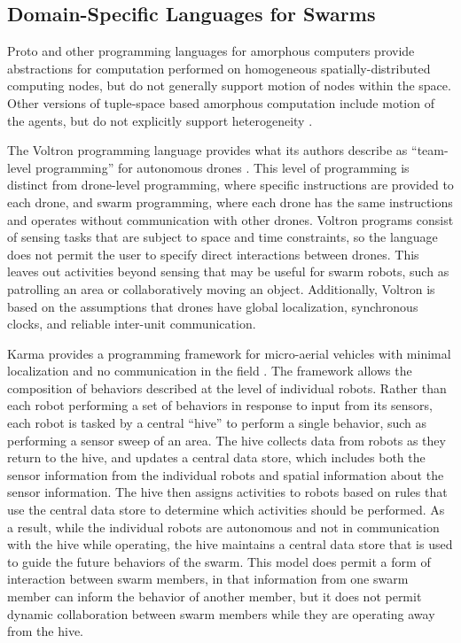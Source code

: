 \subsection{Domain-Specific Languages for Swarms} \label{section:Domain_Specific_Languages_for_Swarms}

Proto and other programming languages for amorphous computers provide abstractions for computation performed on homogeneous spatially-distributed computing nodes, but do not generally support motion of nodes within the space. 
Other versions of tuple-space based amorphous computation include motion of the agents, but do not explicitly support heterogeneity \citep{viroli2012linda}.

The Voltron programming language provides what its authors describe as ``team-level programming'' for autonomous drones \citep{mottola2014team}.
This level of programming is distinct from drone-level programming, where specific instructions are provided to each drone, and swarm programming, where each drone has the same instructions and operates without communication with other drones.
Voltron programs consist of sensing tasks that are subject to space and time constraints, so the language does not permit the user to specify direct interactions between drones. 
This leaves out activities beyond sensing that may be useful for swarm robots, such as patrolling an area or collaboratively moving an object.
Additionally, Voltron is based on the assumptions that drones have global localization, synchronous clocks, and reliable inter-unit communication.   

Karma provides a programming framework for micro-aerial vehicles with minimal localization and no communication in the field \citep{dantu2011programming}.
The framework allows the composition of behaviors described at the level of individual robots. 
Rather than each robot performing a set of behaviors in response to input from its sensors, each robot is tasked by a central ``hive'' to perform a single behavior, such as performing a sensor sweep of an area. 
The hive collects data from robots as they return to the hive, and updates a central data store, which includes both the sensor information from the individual robots and spatial information about the sensor information. 
The hive then assigns activities to robots based on rules that use the central data store to determine which activities should be performed. 
As a result, while the individual robots are autonomous and not in communication with the hive while operating, the hive maintains a central data store that is used to guide the future behaviors of the swarm. 
This model does permit a form of interaction between swarm members, in that information from one swarm member can inform the behavior of another member, but it does not permit dynamic collaboration between swarm members while they are operating away from the hive. 

